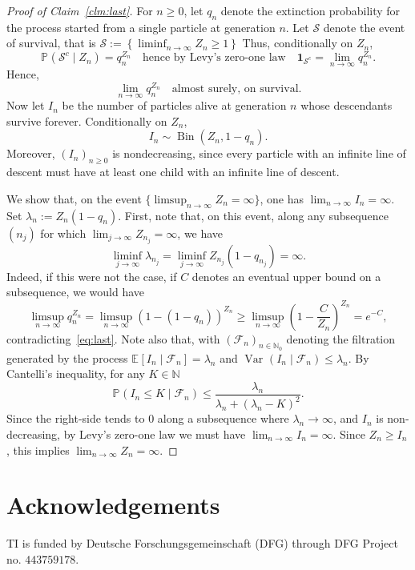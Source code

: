 \documentclass[12pt]{article}
\theoremstyle{definition}
\newcommand{\E}[2][]{\ensuremath{\mathbb{E}_{#1}\left[#2 \right]}}
\newcommand{\Prob}[2][]{\ensuremath{\mathbb{P}_{#1} \left(#2 \right)}}
\newcommand{\Var}[2][]{\operatorname{Var}_{#1}\left(#2\right)}
\begin{document}
\begin{proof}[Proof of Claim~\ref{clm:last}]
For $n\geq 0$, let $q_n$ denote the extinction probability for the process
started from a single particle at generation $n$. Let $\mathcal{S}$ denote the event of survival, that is $\mathcal{S} := \left\{\liminf_{n \to \infty} Z_{n} \geq 1\right\}$ Thus, conditionally on
$Z_n$,
\[
    \Prob{\mathcal{S}^{c} \mid Z_n}
    =
    q_n^{Z_n} \quad \text{hence by Levy's zero-one law} \quad \mathbf{1}_{\mathcal{S}^{c}} = \lim_{n \to \infty} q_{n}^{Z_{n}}.
\]
Hence, 
\begin{equation} \label{eq:last}
    \lim_{n \to \infty} q_{n}^{Z_n} \quad \text{almost surely, on survival}.
\end{equation} Now let $I_n$ be the number of particles alive at generation $n$ whose
descendants survive forever. Conditionally on $Z_n$,
\[
    I_n \sim \operatorname{Bin}(Z_n,1-q_n).
\]
Moreover, $(I_n)_{n\geq 0}$ is nondecreasing, since every particle with an
infinite line of descent must have at least one child with an infinite line of
descent.

We show that, on the event $\{\limsup_{n\to \infty} Z_n=\infty\}$, one has
$\lim_{n \to \infty} I_n = \infty$. Set $\lambda_{n} := Z_{n}(1-q_n)$. First, note that, on this event, along any subsequence $(n_{j})$ for which $\lim_{j \to \infty} Z_{n_{j}} = \infty$, we have \[\liminf_{j \to \infty} \lambda_{n_{j}} = \liminf_{j \to \infty} Z_{n_{j}} (1- q_{n_{j}}) = \infty. \] 
Indeed, if this were not the case, if $C$ denotes an eventual upper bound on a subsequence, we would have 
\begin{equation} \label{eq:upper-bound-rate}
\limsup_{n \to \infty} q_{n}^{Z_{n}} = \limsup_{n \to \infty} (1- (1-q_{n}))^{Z_{n}} \geq \limsup_{n \to \infty} \left( 1 - \frac{C}{Z_{n}}\right)^{Z_{n}} = e^{-C},  
\end{equation}
contradicting~\eqref{eq:last}. Note also that, with $(\mathcal{F}_{n})_{n \in \mathbb{N}_0}$ denoting the filtration generated by the process $\E{I_{n}\mid \mathcal{F}_{n}} = \lambda_{n}$ and $\Var{I_{n}\mid \mathcal{F}_{n}} \leq \lambda_{n}$. By Cantelli's inequality, for any $K \in \mathbb{N}$
\[
\Prob{I_{n} \leq K \mid \mathcal{F}_{n}} \leq \frac{\lambda_{n}}{\lambda_{n} + (\lambda_{n} - K)^2}.
\]
Since the right-side tends to $0$ along a subsequence where $\lambda_{n} \rightarrow \infty$, and $I_{n}$ is non-decreasing, by Levy's zero-one law we must have $\lim_{n\to\infty} I_{n} = \infty$. Since $Z_{n} \geq I_{n}$, this implies $\lim_{n \to \infty} Z_{n} = \infty$. 
\end{proof}

\section*{Acknowledgements}
TI is funded by Deutsche Forschungsgemeinschaft (DFG) through DFG Project no. $443759178$.



\end{document}
